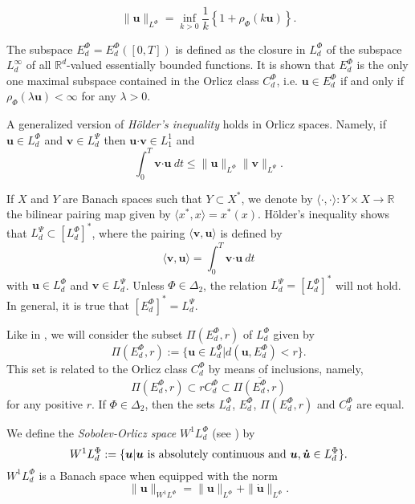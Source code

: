 \documentclass[twoside]{elsarticle}
\theoremstyle{remark}
\newcommand{\orlnor}{\|_{L^{\Phi}}}
\newcommand{\lphi}{L^{\Phi}}
\newcommand{\lpsi}{L^{\Psi}}
\newcommand{\ephi}{E^{\Phi}}
\newcommand{\claseor}{C^{\Phi}}
\newcommand{\wphi}{W^{1}\lphi}
\renewcommand{\b}[1]{\boldsymbol{#1}}
\newcommand{\ccdot}{\b{\cdot}}
\renewcommand{\leq}{\leqslant}
\begin{document}
\begin{equation}\label{amemiya}
\|\b{u}\orlnor=\inf\limits_{k>0}\frac{1}{k}\left\{1+\rho_{\Phi}(k\b{u})\right\}.
\end{equation}



The subspace $\ephi_d=\ephi_d([0,T])$ is defined as the closure in $\lphi_d$ of the subspace $L^{\infty}_d$ of all $\mathbb{R}^d$-valued essentially bounded functions. It is shown that  $\ephi_d$ is the only one maximal subspace contained in the Orlicz class $\claseor_d$, i.e. 
$\b{u}\in\ephi_d$ if and only if $\rho_{\Phi}(\lambda \b{u})<\infty$ for any $\lambda>0$.  

A generalized version of \emph{H\"older's inequality} holds in Orlicz spaces. Namely, if $\b{u}\in\lphi_d$ and $\b{v}\in\lpsi_d$ then $\b{u}\ccdot\b{v}\in L_1^1$ and
\begin{equation}\label{holder}
\int_0^T\b{v}\ccdot\b{u}\ dt\leq \|\b{u}\orlnor\|\b{v}\|_{L^{\Psi}}.
\end{equation}




If $X$ and $Y$ are  Banach spaces such that  $Y\subset X^*$, we denote by $\langle\cdot,\cdot\rangle:Y\times X\to\mathbb{R}$ the bilinear pairing  map given by $\langle x^*,x\rangle=x^*(x)$. H\"older's inequality shows that $\lpsi_d\subset \left[\lphi_d\right]^*$, where the pairing  
$\langle \b{v}, \b{u}\rangle$
is defined by 
\begin{equation}\label{pairing}
  \langle \b{v},\b{u}\rangle=\int_0^T\b{v}\ccdot\b{u}\ dt
\end{equation}
with  $\b{u}\in\lphi_d$ and $\b{v}\in\lpsi_d$.
 Unless $\Phi \in \Delta_2$, the relation $\lpsi_d= \left[\lphi_d\right]^*$ will not hold. In general, it is true  that  $\left[\ephi_d\right]^*=\lpsi_d$.


Like in \cite{KR}, we will consider the subset $\Pi(\ephi_d,r)$ of $\lphi_d$ given by
\[\Pi(\ephi_d,r):=\{\b{u}\in\lphi_d| d(\b{u},\ephi_d)<r\}.\]
This set is related to the Orlicz class $\claseor_d$ by means of inclusions, namely,
\begin{equation}\label{inclusiones}\Pi(\ephi_d, r )\subset r \claseor_d\subset\overline{\Pi(\ephi_d,r)}
\end{equation}
for any positive $r$.
If $\Phi \in \Delta_2$,  then the sets $\lphi_d$, $\ephi_d$, $\Pi(\ephi_d,r)$ and $\claseor_d$ are equal.



We define the \emph{Sobolev-Orlicz space} $\wphi_d$ (see \cite{adams_sobolev}) by
\[\wphi_d:=\{\b{u}| \b{u} \hbox{ is absolutely continuous and } \b{u},\b{\dot{u}}\in \lphi_d\}.\]
$\wphi_d$ is a Banach space when equipped with the norm
\[
\|  \b{u}  \|_{\wphi}= \|  \b{u}  \|_{\lphi} + \|\b{\dot{u}}\orlnor.
\]
\end{document}
